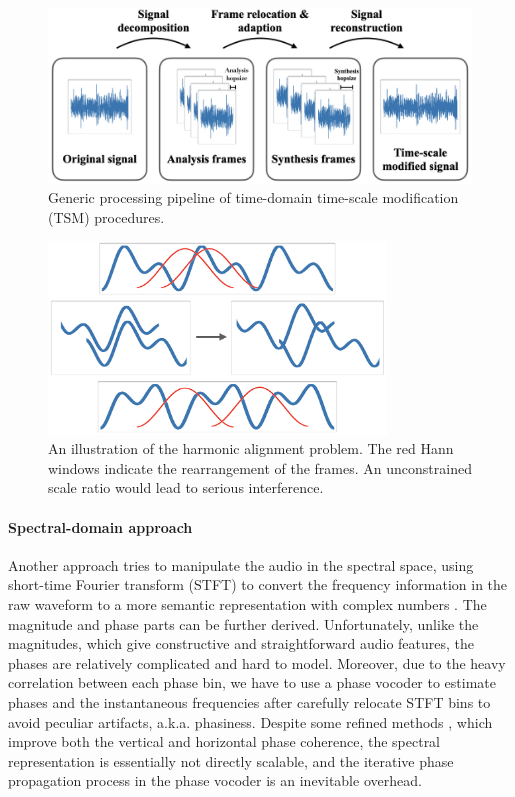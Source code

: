 \documentclass[12pt]{article}
\begin{document}
\begin{figure}
\begin{center}
  \includegraphics[width=.8\textwidth]{assets/figures/tsm-pipeline}
\end{center}
\caption{Generic processing pipeline of time-domain time-scale modification (TSM) procedures.}
\label{fig:tsm-pipeline}
\end{figure}

\begin{figure}
\begin{center}
  \includegraphics[width=0.8\textwidth]{assets/figures/harmonic-aligment}
\end{center}
\caption{An illustration of the harmonic alignment problem. The red Hann windows indicate the rearrangement of the frames. An unconstrained scale ratio would lead to serious interference.}
\label{fig:harmonic-alignment}
\end{figure}

\paragraph{Spectral-domain approach}
Another approach tries to manipulate the audio in the spectral space, using short-time Fourier transform (STFT) to convert the frequency information in the raw waveform to a more semantic representation with complex numbers \cite{lar99}. The magnitude and phase parts can be further derived. Unfortunately, unlike the magnitudes, which give constructive and straightforward audio features, the phases are relatively complicated and hard to model. Moreover, due to the heavy correlation between each phase bin, we have to use a phase vocoder \cite{fla66} to estimate phases and the instantaneous frequencies after carefully relocate STFT bins to avoid peculiar artifacts, a.k.a. phasiness. Despite some refined methods \cite{kra12}\cite{moi11}\cite{nag09}, which improve both the vertical and horizontal phase coherence, the spectral representation is essentially not directly scalable, and the iterative phase propagation process in the phase vocoder is an inevitable overhead.
\end{document}
